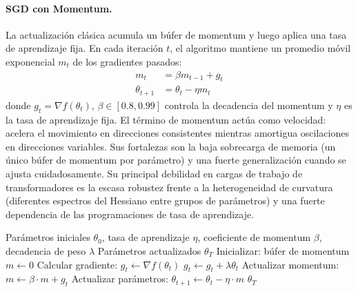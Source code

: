\documentclass[11pt,a4paper]{article}
\begin{document}
\paragraph{SGD con Momentum.}
La actualización clásica acumula un búfer de momentum y luego aplica una tasa de aprendizaje fija. En cada iteración $t$, el algoritmo mantiene un promedio móvil exponencial $m_t$ de los gradientes pasados:
\begin{align}
m_t &= \beta m_{t-1} + g_t \\
\theta_{t+1} &= \theta_t - \eta m_t
\end{align}
donde $g_t = \nabla f(\theta_t)$, $\beta \in [0.8, 0.99]$ controla la decadencia del momentum y $\eta$ es la tasa de aprendizaje fija. El término de momentum actúa como velocidad: acelera el movimiento en direcciones consistentes mientras amortigua oscilaciones en direcciones variables. Sus fortalezas son la baja sobrecarga de memoria (un único búfer de momentum por parámetro) y una fuerte generalización cuando se ajusta cuidadosamente. Su principal debilidad en cargas de trabajo de transformadores es la escasa robustez frente a la heterogeneidad de curvatura (diferentes espectros del Hessiano entre grupos de parámetros) y una fuerte dependencia de las programaciones de tasa de aprendizaje.

\begin{algorithm}[H]
\caption{SGD con Momentum}
\label{alg:sgd-momentum}
\begin{algorithmic}[1]
\Require Parámetros iniciales $\theta_0$, tasa de aprendizaje $\eta$, coeficiente de momentum $\beta$, decadencia de peso $\lambda$
\Ensure Parámetros actualizados $\theta_T$
\State Inicializar: búfer de momentum $m \gets 0$
    \State Calcular gradiente: $g_t \gets \nabla f(\theta_t)$
        \State $g_t \gets g_t + \lambda \theta_t$ 
    \EndIf
    \State Actualizar momentum: $m \gets \beta \cdot m + g_t$
    \State Actualizar parámetros: $\theta_{t+1} \gets \theta_t - \eta \cdot m$
\EndFor
\Return $\theta_T$
\end{algorithmic}
\end{algorithm}
\end{document}

